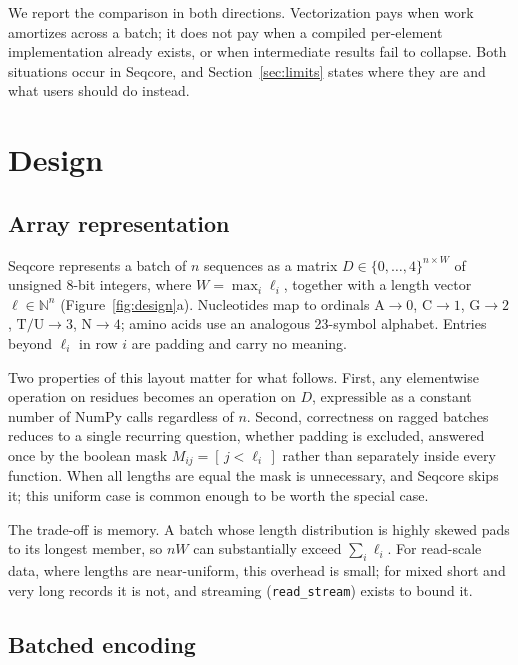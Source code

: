 \documentclass[10pt,letterpaper]{article}
\begin{document}
We report the comparison in both directions. Vectorization pays when work
amortizes across a batch; it does not pay when a compiled per-element
implementation already exists, or when intermediate results fail to collapse.
Both situations occur in Seqcore, and Section~\ref{sec:limits} states where they
are and what users should do instead.

\section{Design}

\subsection{Array representation}
\label{sec:layout}

Seqcore represents a batch of $n$ sequences as a matrix
$D \in \{0,\dots,4\}^{n \times W}$ of unsigned 8-bit integers, where
$W = \max_i \ell_i$, together with a length vector $\ell \in \mathbb{N}^n$
(Figure~\ref{fig:design}a). Nucleotides map to ordinals
$\mathrm{A}\!\to\!0$, $\mathrm{C}\!\to\!1$, $\mathrm{G}\!\to\!2$,
$\mathrm{T}/\mathrm{U}\!\to\!3$, $\mathrm{N}\!\to\!4$; amino acids use an
analogous 23-symbol alphabet. Entries beyond $\ell_i$ in row $i$ are padding and
carry no meaning.

Two properties of this layout matter for what follows. First, any
elementwise operation on residues becomes an operation on $D$, expressible as a
constant number of NumPy calls regardless of $n$. Second, correctness on ragged
batches reduces to a single recurring question, whether padding is excluded,
answered once by the boolean mask
$M_{ij} = [\,j < \ell_i\,]$ rather than separately inside every function. When
all lengths are equal the mask is unnecessary, and Seqcore skips it; this
uniform case is common enough to be worth the special case.

The trade-off is memory. A batch whose length distribution is highly skewed
pads to its longest member, so $nW$ can substantially exceed $\sum_i \ell_i$.
For read-scale data, where lengths are near-uniform, this overhead is small; for
mixed short and very long records it is not, and streaming
(\texttt{read\_stream}) exists to bound it.

\subsection{Batched encoding}
\label{sec:encoding}
\end{document}
